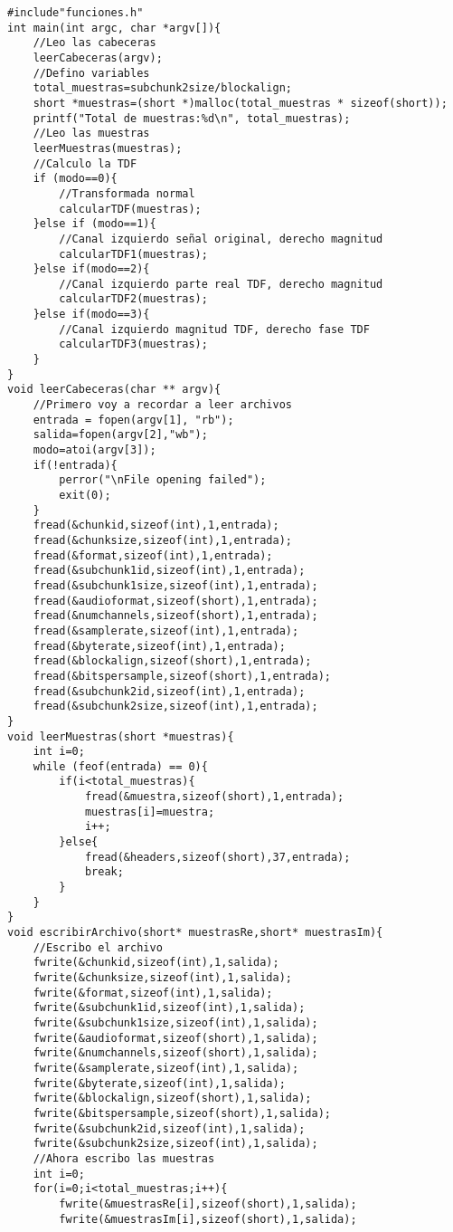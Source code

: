 \begin{lstlisting}[style=CStyle]
#include"funciones.h"
int main(int argc, char *argv[]){
	//Leo las cabeceras
	leerCabeceras(argv);
	//Defino variables    
	total_muestras=subchunk2size/blockalign;
	short *muestras=(short *)malloc(total_muestras * sizeof(short));
	printf("Total de muestras:%d\n", total_muestras);
	//Leo las muestras
	leerMuestras(muestras);
	//Calculo la TDF
	if (modo==0){
		//Transformada normal
		calcularTDF(muestras);
	}else if (modo==1){
		//Canal izquierdo señal original, derecho magnitud
		calcularTDF1(muestras);
	}else if(modo==2){
		//Canal izquierdo parte real TDF, derecho magnitud
		calcularTDF2(muestras);
	}else if(modo==3){
		//Canal izquierdo magnitud TDF, derecho fase TDF
		calcularTDF3(muestras);
	}
}
void leerCabeceras(char ** argv){
	//Primero voy a recordar a leer archivos
	entrada = fopen(argv[1], "rb");
	salida=fopen(argv[2],"wb");
	modo=atoi(argv[3]);
	if(!entrada){
		perror("\nFile opening failed");
		exit(0);
	}
	fread(&chunkid,sizeof(int),1,entrada);
	fread(&chunksize,sizeof(int),1,entrada);
	fread(&format,sizeof(int),1,entrada);
	fread(&subchunk1id,sizeof(int),1,entrada);
	fread(&subchunk1size,sizeof(int),1,entrada);
	fread(&audioformat,sizeof(short),1,entrada);
	fread(&numchannels,sizeof(short),1,entrada);
	fread(&samplerate,sizeof(int),1,entrada);
	fread(&byterate,sizeof(int),1,entrada);
	fread(&blockalign,sizeof(short),1,entrada);
	fread(&bitspersample,sizeof(short),1,entrada);
	fread(&subchunk2id,sizeof(int),1,entrada);
	fread(&subchunk2size,sizeof(int),1,entrada);
}
void leerMuestras(short *muestras){
	int i=0;
	while (feof(entrada) == 0){
		if(i<total_muestras){
			fread(&muestra,sizeof(short),1,entrada);
			muestras[i]=muestra;
			i++;
		}else{
			fread(&headers,sizeof(short),37,entrada);
			break;
		}
	}
}
void escribirArchivo(short* muestrasRe,short* muestrasIm){
	//Escribo el archivo
	fwrite(&chunkid,sizeof(int),1,salida);
	fwrite(&chunksize,sizeof(int),1,salida);
	fwrite(&format,sizeof(int),1,salida);
	fwrite(&subchunk1id,sizeof(int),1,salida);
	fwrite(&subchunk1size,sizeof(int),1,salida);
	fwrite(&audioformat,sizeof(short),1,salida);
	fwrite(&numchannels,sizeof(short),1,salida);
	fwrite(&samplerate,sizeof(int),1,salida);
	fwrite(&byterate,sizeof(int),1,salida);
	fwrite(&blockalign,sizeof(short),1,salida);
	fwrite(&bitspersample,sizeof(short),1,salida);
	fwrite(&subchunk2id,sizeof(int),1,salida);
	fwrite(&subchunk2size,sizeof(int),1,salida);
	//Ahora escribo las muestras
	int i=0;
	for(i=0;i<total_muestras;i++){
		fwrite(&muestrasRe[i],sizeof(short),1,salida);
		fwrite(&muestrasIm[i],sizeof(short),1,salida);

\end{lstlisting}
